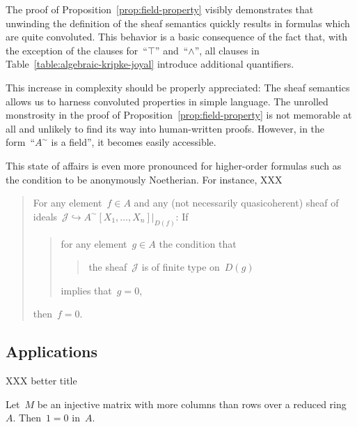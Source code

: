 \documentclass{ws-rv9x6}
\newcommand{\J}{\mathcal{J}}
\renewcommand{\_}{\mathpunct{.}}
\newcommand{\?}{\,{:}\,}
\begin{document}
The proof of Proposition~\ref{prop:field-property} visibly demonstrates that
unwinding the definition of the sheaf semantics quickly results in formulas
which are quite convoluted. This behavior is a basic consequence of the fact
that, with the exception of the clauses for~``$\top$'' and~``$\wedge$'', all
clauses in Table~\ref{table:algebraic-kripke-joyal} introduce additional
quantifiers.

This increase in complexity should be properly appreciated: The sheaf semantics
allows us to harness convoluted properties in simple language. The unrolled
monstrosity in the proof of Proposition~\ref{prop:field-property} is not
memorable at all and unlikely to find its way into human-written proofs.
However, in the form~``$A^\sim$ is a field'', it becomes easily accessible.

This state of affairs is even more pronounced for higher-order formulas such as
the condition to be anonymously Noetherian. For instance, XXX

\begin{quote}
For any element~$f \in A$ and any (not necessarily quasicoherent) sheaf of
ideals~$\J \hookrightarrow A^\sim[X_1,\ldots,X_n]|_{D(f)}$: If
\begin{quote}
for any element~$g \in A$ the condition that
\begin{quote}
the sheaf~$\J$ is of finite type on~$D(g)$
\end{quote}
implies that~$g = 0$,
\end{quote}
then~$f = 0$.
\end{quote}

\subsection{Applications}
\label{sect:example-applications}
XXX better title

\begin{proposition}Let~$M$ be an injective matrix with more columns than rows
over a reduced ring~$A$. Then~$1 = 0$ in~$A$.
\end{proposition}
\end{document}
